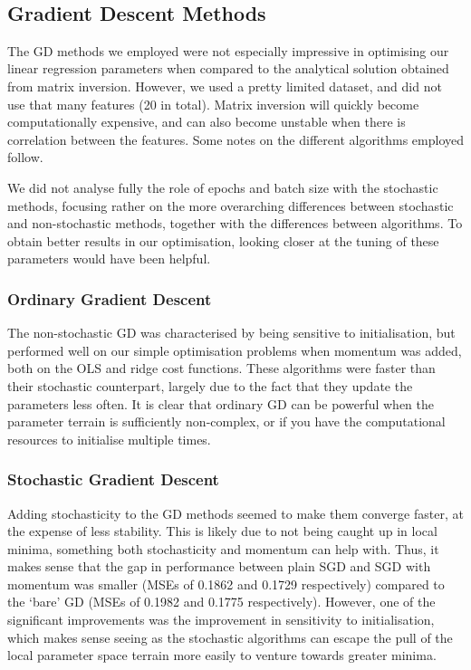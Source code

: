\\

\subsection{Gradient Descent Methods}
    The GD methods we employed were not especially impressive in optimising our linear regression parameters when compared to the analytical solution obtained from matrix inversion. However, we used a pretty limited dataset, and did not use that many features (20 in total). Matrix inversion will quickly become computationally expensive, and can also become unstable when there is correlation between the features. Some notes on the different algorithms employed follow.

    We did not analyse fully the role of epochs and batch size with the stochastic methods, focusing rather on the more overarching differences between stochastic and non-stochastic methods, together with the differences between algorithms. To obtain better results in our optimisation, looking closer at the tuning of these parameters would have been helpful.

    \subsubsection{Ordinary Gradient Descent}
        The non-stochastic GD was characterised by being sensitive to initialisation, but performed well on our simple optimisation problems when momentum was added, both on the OLS and ridge cost functions. These algorithms were faster than their stochastic counterpart, largely due to the fact that they update the parameters less often. It is clear that ordinary GD can be powerful when the parameter terrain is sufficiently non-complex, or if you have the computational resources to initialise multiple times. 

    \subsubsection{Stochastic Gradient Descent}
        Adding stochasticity to the GD methods seemed to make them converge faster, at the expense of less stability. This is likely due to not being caught up in local minima, something both stochasticity and momentum can help with. Thus, it makes sense that the gap in performance between plain SGD and SGD with momentum was smaller (MSEs of 0.1862 and 0.1729 respectively) compared to the `bare' GD (MSEs of 0.1982 and 0.1775 respectively). However, one of the significant improvements was the improvement in sensitivity to initialisation, which makes sense seeing as the stochastic algorithms can escape the pull of the local parameter space terrain more easily to venture towards greater minima.

